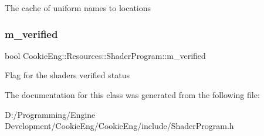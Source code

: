 The cache of uniform names to locations \mbox{\label{class_cookie_eng_1_1_resources_1_1_shader_program_a826816da20d45149ac950ed64daeda50}} 
\subsubsection{\texorpdfstring{m\+\_\+verified}{m\_verified}}
{\footnotesize\ttfamily bool Cookie\+Eng\+::\+Resources\+::\+Shader\+Program\+::m\+\_\+verified\hspace{0.3cm}{\ttfamily [protected]}}

Flag for the shaders verified status 

The documentation for this class was generated from the following file\+:\begin{DoxyCompactItemize}
\item 
D\+:/\+Programming/\+Engine Development/\+Cookie\+Eng/\+Cookie\+Eng/include/Shader\+Program.\+h\end{DoxyCompactItemize}
